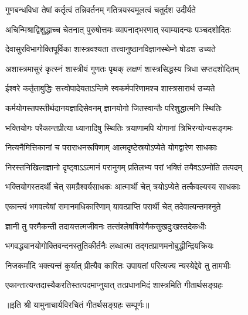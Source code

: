 \twolineshloka
{गुणबन्धविधा तेषां कर्तृत्वं तन्निवर्तनम्}
{गतित्रयस्वमूलत्वं चतुर्दश उदीर्यते}

\twolineshloka
{अचिन्मिश्राद्विशुद्धाच्च चेतनात् पुरुषोत्तमः}
{व्यापनाद्भरणात् स्वाम्यादन्यः पञ्चदशोदितः}

\twolineshloka
{देवासुरविभागोक्तिपूर्विका शास्त्रवश्यता}
{तत्त्वानुष्ठानविज्ञानस्थेम्ने षोडश उच्यते}

\twolineshloka
{अशास्त्रमासुरं कृत्स्नं शास्त्रीयं गुणतः पृथक्}
{लक्षणं शास्त्रसिद्धस्य त्रिधा सप्तदशोदितम्}

\twolineshloka
{ईश्वरे कर्तृताबुद्धिः सत्त्वोपादेयताऽन्तिमे}
{स्वकर्मपरिणामश्च शास्त्रसारार्थ उच्यते}

\twolineshloka
{कर्मयोगस्तपस्तीर्थदानयज्ञादिसेवनम्}
{ज्ञानयोगो जितस्वान्तैः परिशुद्धात्मनि स्थितिः}

\twolineshloka
{भक्तियोगः परैकान्तप्रीत्या ध्यानादिषु स्थितिः}
{त्रयाणामपि योगानां त्रिभिरन्योन्यसङ्गमः}

\twolineshloka
{नित्यनैमित्तिकानां च पराराधनरूपिणाम्}
{आत्मदृष्टेस्रयोऽप्येते योगद्वारेण साधकाः}

\twolineshloka
{निरस्तनिखिलाज्ञानो दृष्ट्वाऽऽत्मानं परानुगम्}
{प्रतिलभ्य परां भक्तिं तयैवऽऽप्नोति तत्पदम्}

\twolineshloka
{भक्तियोगस्तदर्थी चेत् समग्रैश्वर्यसाधकः}
{आत्मार्थी चेत् त्रयोऽप्येते तत्कैवल्यस्य साधकाः}

\twolineshloka
{एकान्त्यं भगवत्येषां समानमधिकारिणाम्}
{यावत्प्राप्ति परार्थी चेत् तदेवात्यन्तमश्नुते}

\twolineshloka
{ज्ञानी तु परमैकन्ती तदायत्तत्मजीवनः}
{तत्संश्लेषवियोगैकसुखदुःखस्तदेकधीः}

\twolineshloka
{भगवद्\mbox{}ध्यानयोगोक्तिवन्दनस्तुतिकीर्तनैः}
{लब्धात्मा तद्गतप्राणमनोबुद्धीन्द्रियक्रियः}

\twolineshloka
{निजकर्मादि भक्त्यन्तं कुर्यात् प्रीत्यैव कारितः}
{उपायतां परित्यज्य न्यस्येद्देवे तु तामभीः}

\twolineshloka
{एकान्तात्यन्तदास्यैकरतिस्तत्पदमाप्नुयात्}
{तत्प्रधानमिदं शास्त्रमिति गीतार्थसङ्ग्रहः}

॥इति श्री यामुनाचार्यविरचितं गीतर्थसङ्ग्रहः सम्पूर्णः॥